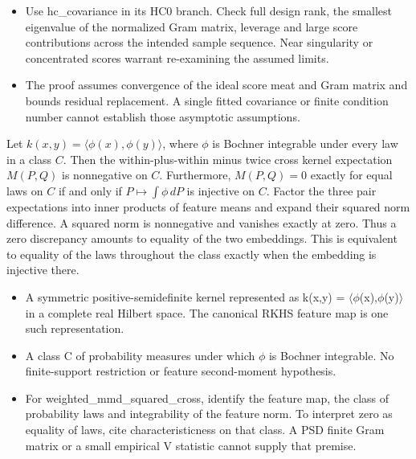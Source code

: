 \expandafter\def\csname statadic@diagnostics@STATADIC-LINEAR-012\endcsname{\begin{itemize}
\item Use hc\_covariance in its HC0 branch. Check full design rank, the smallest eigenvalue of the normalized Gram matrix, leverage and large score contributions across the intended sample sequence. Near singularity or concentrated scores warrant re-examining the assumed limits.
\item The proof assumes convergence of the ideal score meat and Gram matrix and bounds residual replacement. A single fitted covariance or finite condition number cannot establish those asymptotic assumptions.
\end{itemize}}
\expandafter\def\csname statadic@statement@STATADIC-MMD-007\endcsname{Let $k(x,y)=\langle\phi(x),\phi(y)\rangle$, where $\phi$ is
  Bochner integrable under every law in a class $C$. Then the within-plus-within
  minus twice cross kernel expectation $M(P,Q)$ is nonnegative on $C$.
  Furthermore, $M(P,Q)=0$ exactly for equal laws on $C$ if and only if
  $P\mapsto\int\phi\,dP$ is injective on $C$.}
\expandafter\def\csname statadic@proof@STATADIC-MMD-007\endcsname{Factor the three pair expectations into inner products of
  feature means and expand their squared norm difference. A squared norm is
  nonnegative and vanishes exactly at zero. Thus a zero discrepancy amounts
  to equality of the two embeddings. This is equivalent to equality of the
  laws throughout the class exactly when the embedding is injective there.}
\expandafter\def\csname statadic@assumptions@STATADIC-MMD-007\endcsname{\begin{itemize}
\item A symmetric positive-semidefinite kernel represented as k(x,y) = \ensuremath{\langle}\ensuremath{\phi}(x),\ensuremath{\phi}(y)\ensuremath{\rangle} in a complete real Hilbert space. The canonical RKHS feature map is one such representation.
\item A class C of probability measures under which \ensuremath{\phi} is Bochner integrable. No finite-support restriction or feature second-moment hypothesis.
\end{itemize}}
\expandafter\def\csname statadic@diagnostics@STATADIC-MMD-007\endcsname{\begin{itemize}
\item For weighted\_mmd\_squared\_cross, identify the feature map, the class of probability laws and integrability of the feature norm. To interpret zero as equality of laws, cite characteristicness on that class. A PSD finite Gram matrix or a small empirical V statistic cannot supply that premise.
\end{itemize}}
